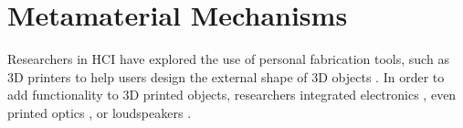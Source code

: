 \chapter{Metamaterial Mechanisms}
\label{chapter:analog-metamaterials}








Researchers in HCI have explored the use of personal fabrication tools, such as 3D printers \cite{Tanenbaum2013} to help users design the external shape of 3D objects \cite{Weichel2014}. In order to add functionality to 3D printed objects, researchers integrated electronics \cite{Savage2013}, even printed optics \cite{Willis2012}, or loudspeakers \cite{Ishiguro2014}.

